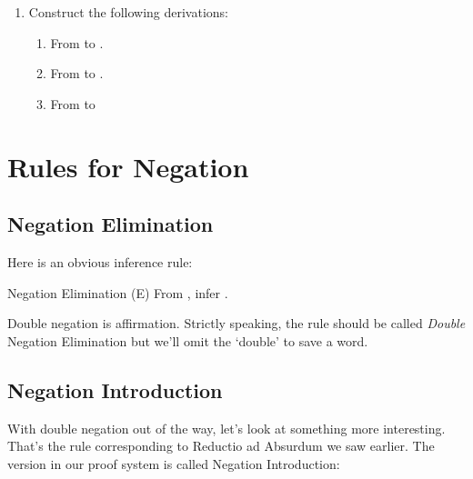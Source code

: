 \begin{enumerate}
 \begin{argument*}




 \end{argument*}




\item Construct the following derivations:

 \begin{enumerate}

  \item From  to .

  \item From  to .

  \item From  to 


\end{enumerate}

\end{enumerate}

\section{Rules for Negation}\label{sec:negationRules}

\subsection{Negation Elimination}

Here is an obvious inference rule:

\begin{infrule}
 \item[Negation Elimination (\p{\lnot}E)] From , 
  infer .
\end{infrule}

Double negation is affirmation. Strictly speaking, the rule should be called 
\emph{Double} Negation Elimination but we'll omit the `double' to save a word.  

\subsection{Negation Introduction}

With double negation out of the way, let's look at something more interesting.  
That's the rule corresponding to Reductio ad Absurdum we saw earlier. The 
version in our proof system is called Negation Introduction:

